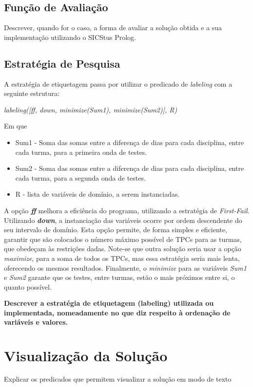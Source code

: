 \documentclass{llncs}
\begin{document}
\subsection{ Função de Avaliação}
Descrever, quando for o caso, a forma de avaliar a solução obtida e a sua implementação utilizando o SICStus Prolog.

\subsection{Estratégia de Pesquisa}

A estratégia de etiquetagem passa por utilizar o predicado de \textit{labeling} com a seguinte estrutura:\newline
\centerline{\textit{labeling([ff, down, minimize(Sum1), minimize(Sum2)], R)}}\newline
 
Em que
\begin{itemize}
\item Sum1 - Soma das somas entre a diferença de dias para cada disciplina, entre cada turma, para a primeira onda de testes.
\item Sum2 - Soma das somas entre a diferença de dias para cada disciplina, entre cada turma, para a segunda onda de testes.
\item R - lista de variáveis de domínio, a serem instanciadas.
\end{itemize}
 
A opção \textit{\textbf{ff}} melhora a eficiência do programa, utilizando a estratégia de \textit{First-Fail}.\newline
Utilizando \textit{\textbf{down}}, a instanciação das variáveis ocorre por ordem descendente do seu intervalo de domínio. Esta opção permite, de forma simples e eficiente, garantir que são colocados o número máximo possível de TPCs para as turmas, que obedeçam às restrições dadas. Note-se que outra solução seria usar a opção \textit{maximize}, para a soma de todos os TPCs, mas essa estratégia seria mais lenta, oferecendo os mesmos resultados.\newline
Finalmente, o \textit{minimize} para as variáveis \textit{Sum1} e \textit{Sum2} garante que os testes, entre turmas, estão o mais próximos entre si, o quanto possível.
 
\textbf{
Descrever a estratégia de etiquetagem
(labeling) utilizada ou implementada, nomeadamente no que diz respeito à ordenação
de variáveis e valores.}


\section{Visualização da Solução}
Explicar os predicados que permitem visualizar a solução em modo de texto
\end{document}
